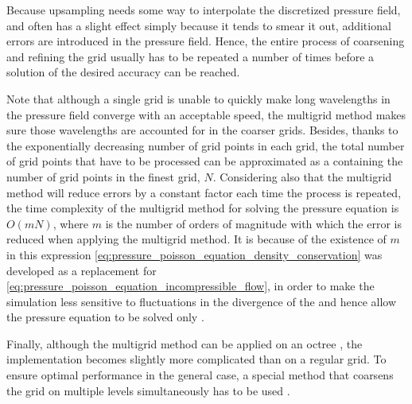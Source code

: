 Because upsampling needs some way to interpolate the discretized pressure field, and often has a slight  effect simply because it tends to smear it out, additional errors are introduced in the pressure field. Hence, the entire process of coarsening and refining the grid usually has to be repeated a number of times before a solution of the desired accuracy can be reached.

Note that although a single grid is unable to quickly make long wavelengths in the pressure field converge with an acceptable speed, the multigrid method makes sure those wavelengths are accounted for in the coarser grids. Besides, thanks to the exponentially decreasing number of grid points in each grid, the total number of grid points that have to be processed can be approximated as a  containing the number of grid points in the finest grid, $N$. Considering also that the multigrid method will reduce errors by a constant factor each time the process is repeated, the time complexity of the multigrid method for solving the pressure equation is $O(mN)$, where $m$ is the number of orders of magnitude with which the error is reduced when applying the multigrid method. It is because of the existence of $m$ in this expression \eqref{eq:pressure_poisson_equation_density_conservation} was developed as a replacement for \eqref{eq:pressure_poisson_equation_incompressible_flow}, in order to make the simulation less sensitive to fluctuations in the divergence of the  and hence allow the pressure equation to be solved only \approximately.

Finally, although the multigrid method can be applied on an octree \citep{Popinet2003,Ji2012}, the implementation becomes slightly more complicated than on a regular grid. To ensure optimal performance in the general case, a special method that coarsens the grid on multiple levels simultaneously has to be used \citep{Popinet2003}.


